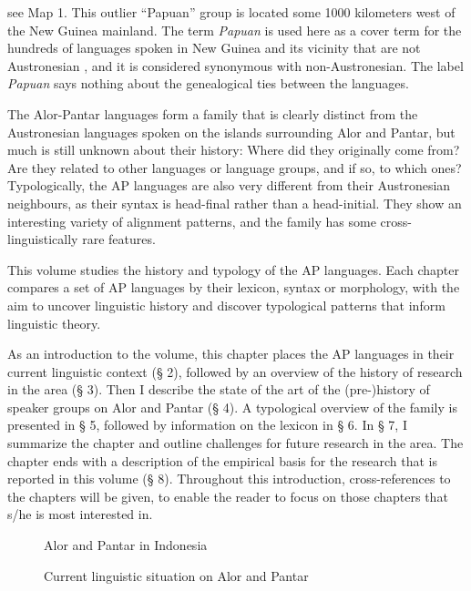 see Map 1. This outlier ``Papuan'' group is located some 1000 kilometers west of the New Guinea mainland. The term \textit{Papuan} is used here as a cover term for the hundreds of languages spoken in New Guinea and its vicinity that are not Austronesian \citep[15]{Ross2005}, and it is considered synonymous with non-Austronesian. The label \textit{Papuan} says nothing about the genealogical ties between the languages.

The Alor-Pantar languages form a family that is clearly distinct from the Austronesian languages spoken on the islands surrounding Alor and Pantar, but much is still unknown about their history: Where did they originally come from? Are they related to other languages or language groups, and if so, to which ones? Typologically, the AP languages are also very different from their Austronesian neighbours, as their syntax is head-final rather than a head-initial. They show an interesting variety of alignment patterns, and the family has some cross-linguistically rare features.

This volume studies the history and typology of the AP languages. Each chapter compares a set of AP languages by their lexicon, syntax or morphology, with the aim to uncover linguistic history and discover typological patterns that inform linguistic theory.

As an introduction to the volume, this chapter places the AP languages in their current linguistic context ({\S} 2), followed by an overview of the history of research in the area ({\S} 3). Then I describe the state of the art of the (pre-)history of speaker groups on Alor and Pantar ({\S} 4). A typological overview of the family is presented in {\S} 5, followed by information on the lexicon in {\S} 6. In {\S} 7, I summarize the chapter and outline challenges for future research in the area. The chapter ends with a description of the empirical basis for the research that is reported in this volume ({\S} 8). Throughout this introduction, cross-references to the chapters will be given, to enable the reader to focus on those chapters that s/he is most interested in.


\begin{figure}
\caption{Alor and Pantar in Indonesia}
\end{figure}

\begin{figure}
\caption{Current linguistic situation on Alor and Pantar}
\end{figure}


